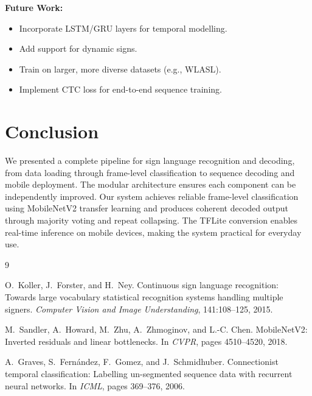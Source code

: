 \documentclass[12pt, a4paper]{article}
\begin{document}
\textbf{Future Work:}
\begin{itemize}
    \item Incorporate LSTM/GRU layers for temporal modelling.
    \item Add support for dynamic signs.
    \item Train on larger, more diverse datasets (e.g., WLASL).
    \item Implement CTC loss for end-to-end sequence training.
\end{itemize}

\section{Conclusion}

We presented a complete pipeline for sign language recognition and decoding, from data loading through frame-level classification to sequence decoding and mobile deployment. The modular architecture ensures each component can be independently improved. Our system achieves reliable frame-level classification using MobileNetV2 transfer learning and produces coherent decoded output through majority voting and repeat collapsing. The TFLite conversion enables real-time inference on mobile devices, making the system practical for everyday use.

\begin{thebibliography}{9}

O.~Koller, J.~Forster, and H.~Ney.
\newblock Continuous sign language recognition: Towards large vocabulary statistical recognition systems handling multiple signers.
\newblock \emph{Computer Vision and Image Understanding}, 141:108--125, 2015.

M.~Sandler, A.~Howard, M.~Zhu, A.~Zhmoginov, and L.-C. Chen.
\newblock MobileNetV2: Inverted residuals and linear bottlenecks.
\newblock In \emph{CVPR}, pages 4510--4520, 2018.

A.~Graves, S.~Fern{\'a}ndez, F.~Gomez, and J.~Schmidhuber.
\newblock Connectionist temporal classification: Labelling un-segmented sequence data with recurrent neural networks.
\newblock In \emph{ICML}, pages 369--376, 2006.

\end{thebibliography}
\end{document}
